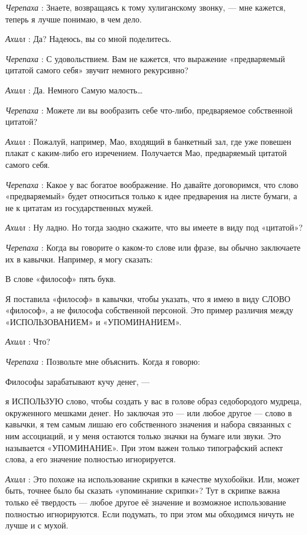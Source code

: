 \documentclass[../main.tex]{subfiles}
\begin{document}
\begin{dialogue}
\emph{Черепаха} : Знаете, возвращаясь к тому хулиганскому звонку, --- мне кажется, теперь я лучше понимаю, в чем дело.

\emph{Ахилл} : Да? Надеюсь, вы со мной поделитесь.

\emph{Черепаха} : С удовольствием. Вам не кажется, что выражение «предваряемый цитатой самого себя» звучит немного рекурсивно?

\emph{Ахилл} : Да. Немного Самую малость\ldots{}

\emph{Черепаха} : Можете ли вы вообразить себе что-либо, предваряемое собственной цитатой?

\emph{Ахилл} : Пожалуй, например, Мао, входящий в банкетный зал, где уже повешен плакат с каким-либо его изречением. Получается Мао, предваряемый цитатой самого себя.

\emph{Черепаха} : Какое у вас богатое воображение. Но давайте договоримся, что слово «предваряемый» будет относиться только к идее предварения на листе бумаги, а не к цитатам из государственных мужей.

\emph{Ахилл} : Ну ладно. Но тогда заодно скажите, что вы имеете в виду под «цитатой»?

\emph{Черепаха} : Когда вы говорите о каком-то слове или фразе, вы обычно заключаете их в кавычки. Например, я могу сказать:

В слове «философ» пять букв.

Я поставила «философ» в кавычки, чтобы указать, что я имею в виду СЛОВО «философ», а не философа собственной персоной. Это пример различия между «ИСПОЛЬЗОВАНИЕМ» и «УПОМИНАНИЕМ».

\emph{Ахилл} : Что?

\emph{Черепаха} : Позвольте мне объяснить. Когда я говорю:

Философы зарабатывают кучу денег, ---

я ИСПОЛЬЗУЮ слово, чтобы создать у вас в голове образ седобородого мудреца, окруженного мешками денег. Но заключая это --- или любое другое --- слово в кавычки, я тем самым лишаю его собственного значения и набора связанных с ним ассоциаций, и у меня остаются только значки на бумаге или звуки. Это называется «УПОМИНАНИЕ». При этом важен только типографский аспект слова, а его значение полностью игнорируется.

\emph{Ахилл} : Это похоже на использование скрипки в качестве мухобойки. Или, может быть, точнее было бы сказать «упоминание скрипки»? Тут в скрипке важна только её твердость --- любое другое её значение и возможное использование полностью игнорируются. Если подумать, то при этом мы обходимся ничуть не лучше и с мухой.


\end{dialogue}
\end{document}
